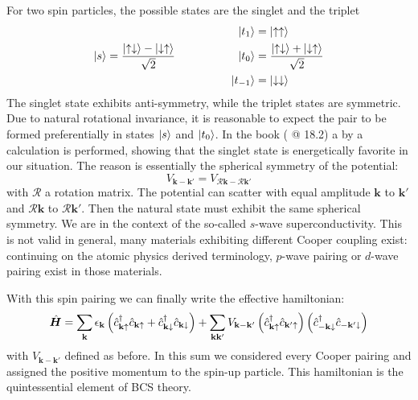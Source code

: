 For two spin \half particles, the possible states are the singlet and the triplet
\[
	\ket{s} = \frac{\ket{\uparrow\downarrow}-\ket{\downarrow\uparrow}}{\sqrt{2}}
	\hspace{5em}
	\begin{aligned}
		\ket{t_1} &= \ket{\uparrow\uparrow} \\
		\ket{t_0} &= \frac{\ket{\uparrow\downarrow}+\ket{\downarrow\uparrow}}{\sqrt{2}} \\
		\ket{t_{-1}} &= \ket{\downarrow\downarrow}
	\end{aligned}
\]
The singlet state exhibits anti-symmetry, while the triplet states are symmetric. Due to natural rotational invariance, it is reasonable to expect the pair to be formed preferentially in states $\ket{s}$ and $\ket{t_0}$. In the book  (\cite{grosso2000solid} @ 18.2) a by \citeauthor{grosso2000solid} a calculation is performed, showing that the singlet state is energetically favorite in our situation. The reason is essentially the spherical symmetry of the potential:
\[
	V_{\mathbf{k}-\mathbf{k}'} = V_{\mathcal{R}\mathbf{k}-\mathcal{R}\mathbf{k}'}
\]
with $\mathcal{R}$ a rotation matrix. The potential can scatter with equal amplitude $\mathbf{k}$ to $\mathbf{k}'$ and $\mathcal{R}\mathbf{k}$ to $\mathcal{R}\mathbf{k}'$. Then the natural state must exhibit the same spherical symmetry. We are in the context of the so-called $s$-wave superconductivity. This is not valid in general, many materials exhibiting different Cooper coupling exist: continuing on the atomic physics derived terminology, $p$-wave pairing or $d$-wave pairing exist in those materials.

With this spin pairing we can finally write the effective hamiltonian:
\[
	\hat{\bm H} = \sum_{\mathbf{k}} \epsilon_{\mathbf{k}} \left({\hat{c}_{\mathbf{k}\uparrow}^\dagger \hat{c}_{\mathbf{k}\uparrow} + \hat{c}_{\mathbf{k}\downarrow}^\dagger \hat{c}_{\mathbf{k}\downarrow}}\right) + \sum_{\mathbf{k}\mathbf{k}'} V_{\mathbf{k}-\mathbf{k}'} \left({\hat{c}_{\mathbf{k}\uparrow}^\dagger \hat{c}_{\mathbf{k}'\uparrow}}\right) \left({\hat{c}_{-\mathbf{k}\downarrow}^\dagger \hat{c}_{-\mathbf{k}'\downarrow}}\right)
\]
with $V_{\mathbf{k}-\mathbf{k}'}$ defined as before. In this sum we considered every Cooper pairing and assigned the positive momentum to the spin-up particle. This hamiltonian is the quintessential element of BCS theory.

